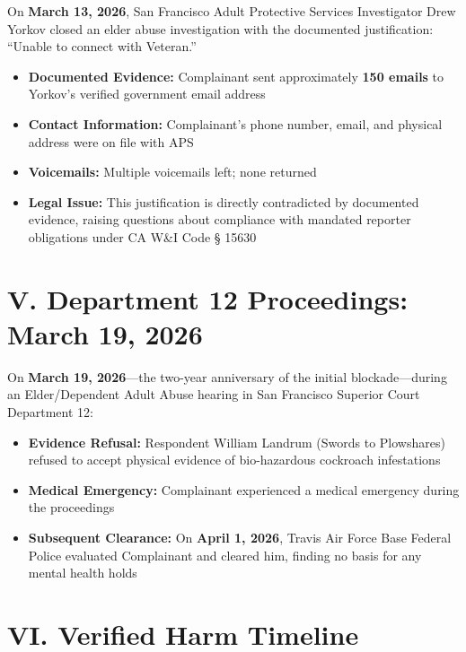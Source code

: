 \documentclass[11pt, a4paper]{article}
\begin{document}
On \textbf{March 13, 2026}, San Francisco Adult Protective Services Investigator Drew Yorkov closed an elder abuse investigation with the documented justification: ``Unable to connect with Veteran.''

\begin{itemize}
    \item \textbf{Documented Evidence:} Complainant sent approximately \textbf{150 emails} to Yorkov's verified government email address
    \item \textbf{Contact Information:} Complainant's phone number, email, and physical address were on file with APS
    \item \textbf{Voicemails:} Multiple voicemails left; none returned
    \item \textbf{Legal Issue:} This justification is directly contradicted by documented evidence, raising questions about compliance with mandated reporter obligations under CA W\&I Code § 15630
\end{itemize}

\vspace{0.5cm}

\section{V. Department 12 Proceedings: March 19, 2026}

On \textbf{March 19, 2026}---the two-year anniversary of the initial blockade---during an Elder/Dependent Adult Abuse hearing in San Francisco Superior Court Department 12:

\begin{itemize}
    \item \textbf{Evidence Refusal:} Respondent William Landrum (Swords to Plowshares) refused to accept physical evidence of bio-hazardous cockroach infestations
    \item \textbf{Medical Emergency:} Complainant experienced a medical emergency during the proceedings
    \item \textbf{Subsequent Clearance:} On \textbf{April 1, 2026}, Travis Air Force Base Federal Police evaluated Complainant and cleared him, finding no basis for any mental health holds
\end{itemize}

\vspace{0.5cm}

\section{VI. Verified Harm Timeline}
\end{document}
